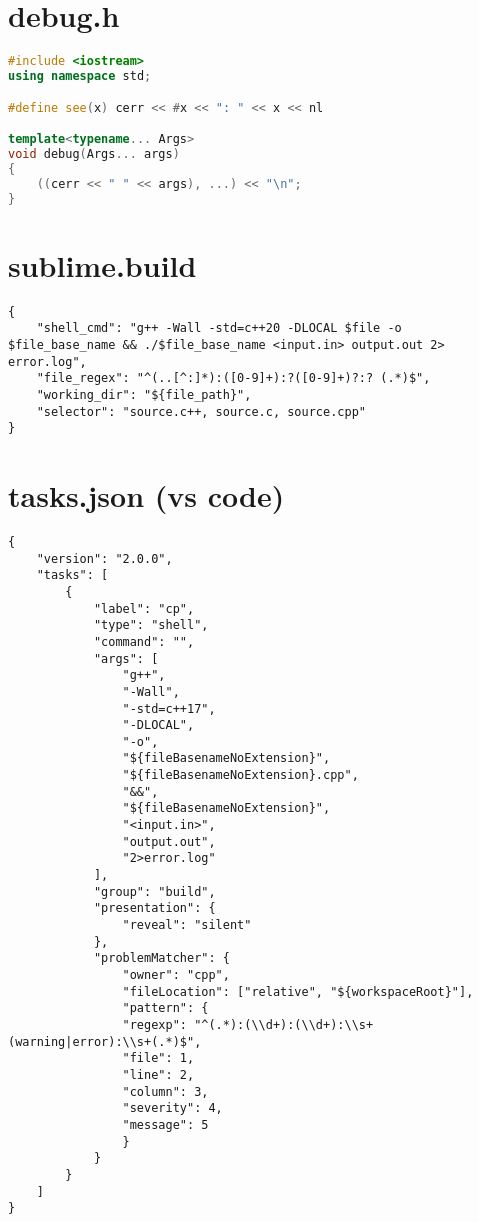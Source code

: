 \section{debug.h}
\begin{lstlisting}[language=C++]
#include <iostream>
using namespace std;

#define see(x) cerr << #x << ": " << x << nl

template<typename... Args>
void debug(Args... args)
{
    ((cerr << " " << args), ...) << "\n";
}
\end{lstlisting}
\sectionend

\section{sublime.build}
\begin{lstlisting}
{
    "shell_cmd": "g++ -Wall -std=c++20 -DLOCAL $file -o $file_base_name && ./$file_base_name <input.in> output.out 2> error.log",
    "file_regex": "^(..[^:]*):([0-9]+):?([0-9]+)?:? (.*)$",
    "working_dir": "${file_path}",
    "selector": "source.c++, source.c, source.cpp"
}
\end{lstlisting}
\sectionend

\section{tasks.json (vs code)}
\begin{lstlisting}
{
    "version": "2.0.0",
    "tasks": [
        {
            "label": "cp",
            "type": "shell",
            "command": "",
            "args": [
                "g++",
                "-Wall",
                "-std=c++17",
                "-DLOCAL",
                "-o",
                "${fileBasenameNoExtension}",
                "${fileBasenameNoExtension}.cpp",
                "&&",
                "${fileBasenameNoExtension}",
                "<input.in>",
                "output.out",
                "2>error.log"
            ],
            "group": "build",
            "presentation": {
                "reveal": "silent"
            },
            "problemMatcher": {
                "owner": "cpp",
                "fileLocation": ["relative", "${workspaceRoot}"],
                "pattern": {
                "regexp": "^(.*):(\\d+):(\\d+):\\s+(warning|error):\\s+(.*)$",
                "file": 1,
                "line": 2,
                "column": 3,
                "severity": 4,
                "message": 5
                }
            }
        }
    ]
}
\end{lstlisting}
\sectionend

